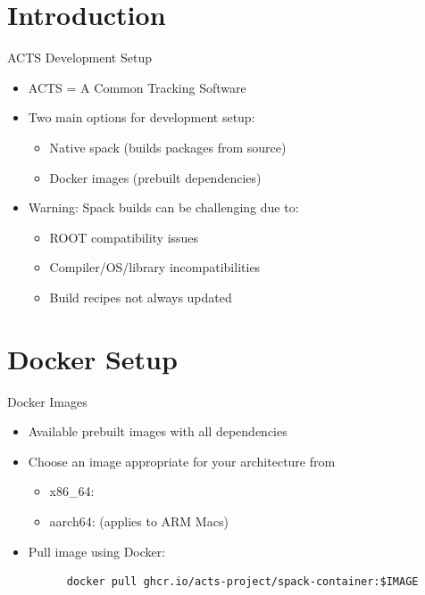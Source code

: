 \documentclass[lualatex,aspectratio=169,t,13pt,dvipsnames]{beamer}
\begin{document}
\maketitle

\section{Introduction}

\begin{frame}{ACTS Development Setup}
  \begin{itemize}
    \item ACTS = A Common Tracking Software
    \item Two main options for development setup:
    \begin{itemize}
      \item Native spack (builds packages from source)
      \item Docker images (prebuilt dependencies)
    \end{itemize}
    \item Warning: Spack builds can be challenging due to:
    \begin{itemize}
      \item ROOT compatibility issues
      \item Compiler/OS/library incompatibilities
      \item Build recipes not always updated
    \end{itemize}
  \end{itemize}
\end{frame}

\section{Docker Setup}
\begin{frame}[fragile]{Docker Images}
  \begin{itemize}
    \item Available prebuilt images with all dependencies
    \item Choose an image appropriate for your architecture from 
    \begin{itemize}
      \item x86\_64: 
      \item aarch64:  (applies to ARM Macs)
    \end{itemize}
    \item Pull image using Docker:\\
    \begin{verbatim}
      docker pull ghcr.io/acts-project/spack-container:$IMAGE
    \end{verbatim}
  \end{itemize}
\end{frame}
\end{document}
